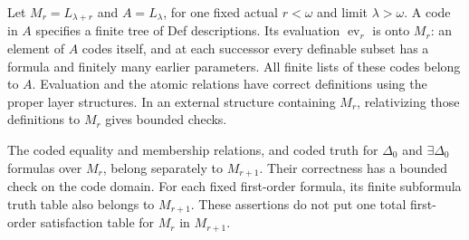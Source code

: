 Let $M_r=L_{\lambda+r}$ and $A=L_\lambda$, for one fixed actual
$r<\omega$ and limit $\lambda>\omega$. A code in $A$ specifies a finite
tree of Def descriptions. Its evaluation $\operatorname{ev}_r$ is onto
$M_r$: an element of $A$ codes itself, and at each successor every
definable subset has a formula and finitely many earlier parameters.
All finite lists of these codes belong to $A$. Evaluation and the
atomic relations have correct definitions using the proper layer
structures. In an external structure containing $M_r$, relativizing
those definitions to $M_r$ gives bounded checks.

\begin{lemma}\label{lem:partial-truth}
The coded equality and membership relations, and coded truth for
$\Delta_0$ and $\exists\Delta_0$ formulas over $M_r$, belong separately
to $M_{r+1}$. Their correctness has a bounded check on the code domain.
For each fixed first-order formula, its finite subformula truth table
also belongs to $M_{r+1}$. These assertions do not put one total
first-order satisfaction table for $M_r$ in $M_{r+1}$.
\end{lemma}
